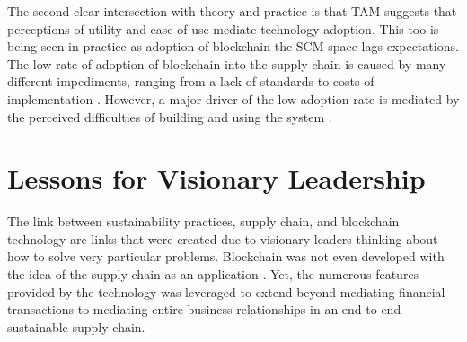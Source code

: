 The second clear intersection with theory and practice is that TAM suggests that perceptions of utility and ease of use mediate technology adoption. This too is being seen in practice as adoption of blockchain the SCM space lags expectations. The low rate of adoption of blockchain into the supply chain is caused by many different impediments, ranging from a lack of standards to costs of implementation \parencite{kristofferfranciscoSupplyChainHas2018}. However, a major driver of the low adoption rate is mediated by the perceived difficulties of building and using the system \parencite{papathanasiouNonApplicationBlockchain2020, kambleUnderstandingBlockchainTechnology2019a, partalaUnderstandingMostInfluential2015}.

\section{Lessons for Visionary Leadership}

The link between sustainability practices, supply chain, and blockchain technology are links that were created due to visionary leaders thinking about how to solve very particular problems. Blockchain was not even developed with the idea of the supply chain as an application \parencite{hughesBitcoinWhatBlockchain2019}. Yet, the numerous features provided by the technology was leveraged to extend beyond mediating financial transactions to mediating entire business relationships in an end-to-end sustainable supply chain.
